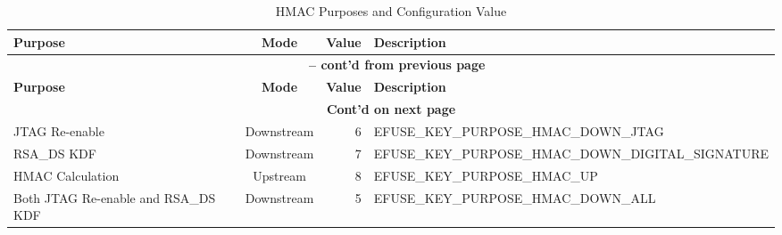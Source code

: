 \begin{longtable}[c]{|p{3.5cm}|c|r|p{9.5cm}|}
\caption{HMAC Purposes and Configuration Value}
\label{tab:hmac-key-purpose}
\\    \hline
    \rowcolor{lightgray}
    \textbf{Purpose} & \textbf{Mode} & \textbf{Value} & \textbf{Description}\\
    \hline
    \endfirsthead
    \multicolumn{4}{c}{\bfseries \tablename\ \thetable{} -- cont'd from previous page}\\\hline

    \rowcolor{lightgray}
    \textbf{Purpose} & \textbf{Mode} & \textbf{Value} & \textbf{Description}\\
    \hline
    \endhead
    \multicolumn{4}{c}{\textbf{Cont'd on next page}}\\
    \endfoot
    \endlastfoot

    \hline
    JTAG Re-enable & Downstream & 6 & EFUSE\_KEY\_PURPOSE\_HMAC\_DOWN\_JTAG \\
    \hline
    RSA\_DS KDF & Downstream & 7 & EFUSE\_KEY\_PURPOSE\_HMAC\_DOWN\_DIGITAL\_SIGNATURE \\
    \hline
    HMAC Calculation  & Upstream & 8 & EFUSE\_KEY\_PURPOSE\_HMAC\_UP \\
    \hline
    Both JTAG Re-enable and RSA\_DS KDF & Downstream & 5 & EFUSE\_KEY\_PURPOSE\_HMAC\_DOWN\_ALL \\
    \hline
\end{longtable}
